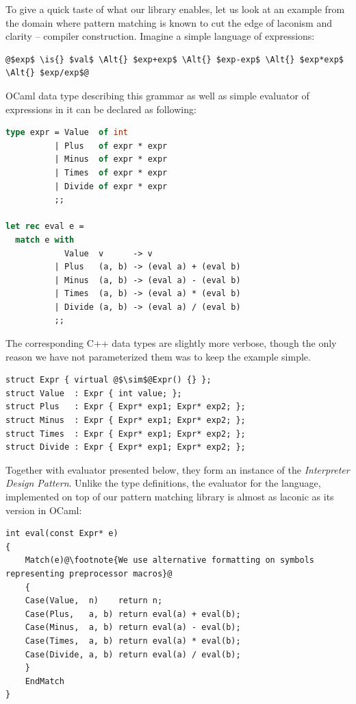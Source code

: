 \documentclass[preprint]{sigplanconf}
\newcommand{\Alt}{\ensuremath{|}}
\newcommand{\is}{$::=$}
\begin{document}
To give a quick taste of what our library enables, let us look at an example from 
the domain where pattern matching is known to cut the edge of laconism and 
clarity -- compiler construction. Imagine a simple language of expressions:

\begin{lstlisting}
@$exp$ \is{} $val$ \Alt{} $exp+exp$ \Alt{} $exp-exp$ \Alt{} $exp*exp$ \Alt{} $exp/exp$@
\end{lstlisting}

OCaml data type describing this grammar as well as simple evaluator of expressions 
in it can be declared as following:

\begin{lstlisting}[language=Caml,keepspaces,columns=flexible]
type expr = Value  of int
          | Plus   of expr * expr
          | Minus  of expr * expr
          | Times  of expr * expr
          | Divide of expr * expr
          ;;

let rec eval e =
  match e with
            Value  v      -> v
          | Plus   (a, b) -> (eval a) + (eval b)
          | Minus  (a, b) -> (eval a) - (eval b)
          | Times  (a, b) -> (eval a) * (eval b)
          | Divide (a, b) -> (eval a) / (eval b)
          ;;
\end{lstlisting}

The corresponding C++ data types are slightly more verbose, though the only 
reason we have not parameterized them was to keep the example simple.

\begin{lstlisting}[keepspaces,columns=flexible]
struct Expr { virtual @$\sim$@Expr() {} };
struct Value  : Expr { int value; };
struct Plus   : Expr { Expr* exp1; Expr* exp2; };
struct Minus  : Expr { Expr* exp1; Expr* exp2; };
struct Times  : Expr { Expr* exp1; Expr* exp2; };
struct Divide : Expr { Expr* exp1; Expr* exp2; };
\end{lstlisting}

Together with evaluator presented below, they form an instance of the 
\emph{Interpreter Design Pattern}\cite{DesignPatterns1993}. Unlike the type 
definitions, the evaluator for the language, implemented on top of our pattern 
matching library is almost as laconic as its version in OCaml:

\begin{lstlisting}[keepspaces,columns=flexible]
int eval(const Expr* e)
{
    Match(e)@\footnote{We use alternative formatting on symbols representing preprocessor macros}@
    {
    Case(Value,  n)    return n;
    Case(Plus,   a, b) return eval(a) + eval(b);
    Case(Minus,  a, b) return eval(a) - eval(b);
    Case(Times,  a, b) return eval(a) * eval(b);
    Case(Divide, a, b) return eval(a) / eval(b);
    }
    EndMatch
}
\end{lstlisting}
\end{document}
